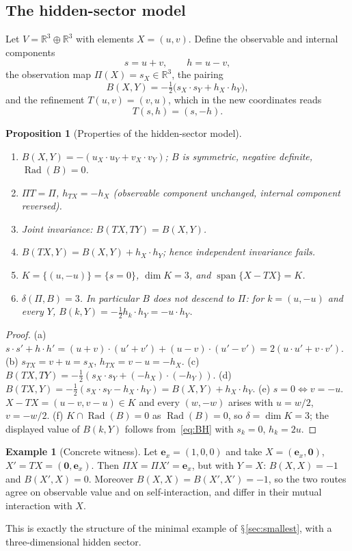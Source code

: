 \documentclass[11pt,a4paper]{article}
\renewcommand{\S}{\ensuremath{\mathsection}}
\newcommand{\RR}{\mathbb{R}}
\newcommand{\Rad}{\operatorname{Rad}}
\newcommand{\spn}{\operatorname{span}}
\newcommand{\defic}{\delta}
\theoremstyle{plain}
\newtheorem{proposition}[theorem]{Proposition}
\theoremstyle{definition}
\newtheorem{example}[theorem]{Example}
\begin{document}
\subsection{The hidden-sector model}\label{sec:modelH}
Let $V=\RR^3\oplus\RR^3$ with elements $X=(u,v)$. Define the observable and internal components
\[ s=u+v,\qquad h=u-v, \]
the observation map $\Pi(X)=s_X\in\RR^3$, the pairing
\begin{equation}\label{eq:BH}
B(X,Y)=-\tfrac12\bigl(s_X\!\cdot s_Y+h_X\!\cdot h_Y\bigr),
\end{equation}
and the refinement $T(u,v)=(v,u)$, which in the new coordinates reads
\begin{equation}\label{eq:Th}
T(s,h)=(s,-h).
\end{equation}
\begin{proposition}[Properties of the hidden-sector model]\label{prop:H}
\begin{enumerate}[label=(\alph*)]
\item $B(X,Y)=-(u_X\!\cdot u_Y+v_X\!\cdot v_Y)$; $B$ is symmetric, negative definite, $\Rad(B)=0$.
\item $\Pi T=\Pi$, $h_{TX}=-h_X$ (observable component unchanged, internal component reversed).
\item Joint invariance: $B(TX,TY)=B(X,Y)$.
\item $B(TX,Y)=B(X,Y)+h_X\!\cdot h_Y$; hence independent invariance fails.
\item $K=\{(u,-u)\}=\{s=0\}$, $\dim K=3$, and $\spn\{X-TX\}=K$.
\item $\defic(\Pi,B)=3$. In particular $B$ does \emph{not} descend to $\Pi$: for $k=(u,-u)$ and every $Y$, $B(k,Y)=-\tfrac12h_k\!\cdot h_Y=-u\!\cdot h_Y$.
\end{enumerate}
\end{proposition}
\begin{proof}
(a) $s\!\cdot\!s'+h\!\cdot\!h'=(u{+}v)\!\cdot\!(u'{+}v')+(u{-}v)\!\cdot\!(u'{-}v')=2(u\!\cdot\!u'+v\!\cdot\!v')$.
(b) $s_{TX}=v+u=s_X$, $h_{TX}=v-u=-h_X$.
(c) $B(TX,TY)=-\tfrac12(s_X\!\cdot s_Y+(-h_X)\!\cdot(-h_Y))$.
(d) $B(TX,Y)=-\tfrac12(s_X\!\cdot s_Y-h_X\!\cdot h_Y)=B(X,Y)+h_X\!\cdot h_Y$.
(e) $s=0\iff v=-u$. $X-TX=(u-v,v-u)\in K$ and every $(w,-w)$ arises with $u=w/2$, $v=-w/2$.
(f) $K\cap\Rad(B)=0$ as $\Rad(B)=0$, so $\defic=\dim K=3$; the displayed value of $B(k,Y)$ follows from~\eqref{eq:BH} with $s_k=0$, $h_k=2u$.
\end{proof}
\begin{example}[Concrete witness]\label{ex:witness}
Let $\mathbf e_x=(1,0,0)$ and take $X=(\mathbf e_x,\mathbf 0)$, $X'=TX=(\mathbf 0,\mathbf e_x)$. Then $\Pi X=\Pi X'=\mathbf e_x$, but with $Y=X$: $B(X,X)=-1$ and $B(X',X)=0$.
Moreover $B(X,X)=B(X',X')=-1$, so the two routes agree on observable value and on self-interaction, and differ in their mutual interaction with $X$.
\end{example}
This is exactly the structure of the minimal example of \S\ref{sec:smallest}, with a three-dimensional hidden sector.
\end{document}
